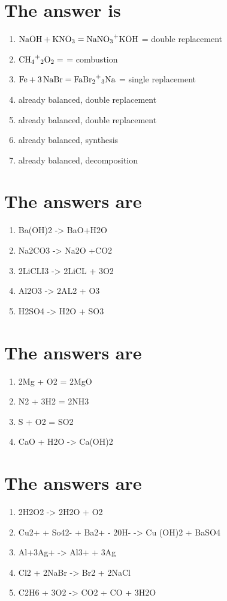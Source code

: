 \documentclass{scrartcl}
\begin{document}
\section{The answer is}
\label{sec:org2241998}
\begin{enumerate}
\item \(\ce{NaOH + KNO3}=\ce{NaNO3+KOH}\) = double replacement
\item \(\ce{CH4+2O2}=\ce{}\) = combustion
\item \(\ce{Fe + 3NaBr}=\ce{FaBr2+3Na}\) = single replacement
\item already balanced, double replacement
\item already balanced, double replacement
\item already balanced, synthesis
\item already balanced, decomposition
\end{enumerate}

\section{The answers are}
\label{sec:org1d35c07}
\begin{enumerate}
\item Ba(OH)2 -> BaO+H2O
\item Na2CO3 -> Na2O +CO2
\item 2LiCLI3 -> 2LiCL + 3O2
\item Al2O3 -> 2AL2 + O3
\item H2SO4 -> H2O + SO3
\end{enumerate}

\section{The answers are}
\label{sec:org82618ff}
\begin{enumerate}
\item 2Mg + O2 = 2MgO
\item N2 + 3H2 = 2NH3
\item S + O2 = SO2
\item CaO + H2O -> Ca(OH)2
\end{enumerate}

\section{The answers are}
\label{sec:org9ef7511}
\begin{enumerate}
\item 2H2O2 -> 2H2O + O2
\item Cu2+ + So42- + Ba2+ - 20H- -> Cu (OH)2 + BaSO4
\item Al+3Ag+ -> Al3+ + 3Ag
\item Cl2 + 2NaBr -> Br2 + 2NaCl
\item C2H6 + 3O2 -> CO2 + CO + 3H2O
\end{enumerate}
\end{document}
